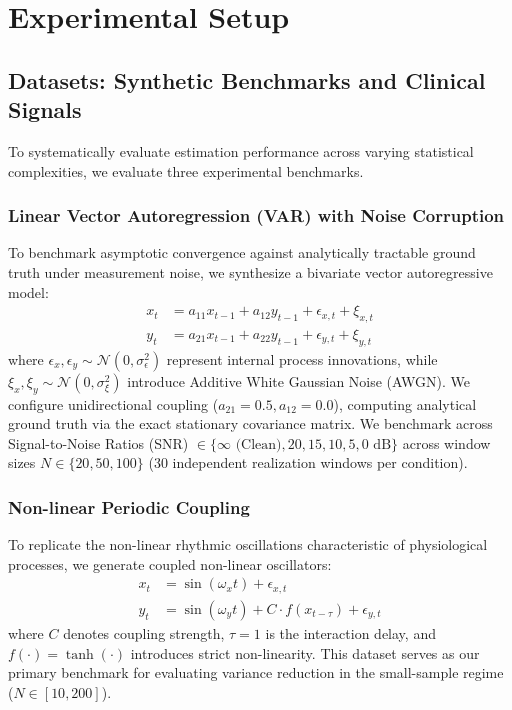 \section{Experimental Setup}

\subsection{Datasets: Synthetic Benchmarks and Clinical Signals}
To systematically evaluate estimation performance across varying statistical complexities, we evaluate three experimental benchmarks.

\subsubsection{Linear Vector Autoregression (VAR) with Noise Corruption}
To benchmark asymptotic convergence against analytically tractable ground truth under measurement noise, we synthesize a bivariate vector autoregressive model:
\begin{align}
    x_t &= a_{11} x_{t-1} + a_{12} y_{t-1} + \epsilon_{x,t} + \xi_{x,t} \\
    y_t &= a_{21} x_{t-1} + a_{22} y_{t-1} + \epsilon_{y,t} + \xi_{y,t}
\end{align}
where $\epsilon_x, \epsilon_y \sim \mathcal{N}(0, \sigma_\epsilon^2)$ represent internal process innovations, while $\xi_x, \xi_y \sim \mathcal{N}(0, \sigma_\xi^2)$ introduce Additive White Gaussian Noise (AWGN). We configure unidirectional coupling ($a_{21} = 0.5, a_{12} = 0.0$), computing analytical ground truth via the exact stationary covariance matrix. We benchmark across Signal-to-Noise Ratios (SNR) $\in \{\infty \text{ (Clean)}, 20, 15, 10, 5, 0\text{ dB}\}$ across window sizes $N \in \{20, 50, 100\}$ (30 independent realization windows per condition).

\subsubsection{Non-linear Periodic Coupling}
To replicate the non-linear rhythmic oscillations characteristic of physiological processes, we generate coupled non-linear oscillators:
\begin{align}
    x_t &= \sin(\omega_x t) + \epsilon_{x,t} \\
    y_t &= \sin(\omega_y t) + C \cdot f(x_{t-\tau}) + \epsilon_{y,t}
\end{align}
where $C$ denotes coupling strength, $\tau = 1$ is the interaction delay, and $f(\cdot) = \tanh(\cdot)$ introduces strict non-linearity. This dataset serves as our primary benchmark for evaluating variance reduction in the small-sample regime ($N \in [10, 200]$).

